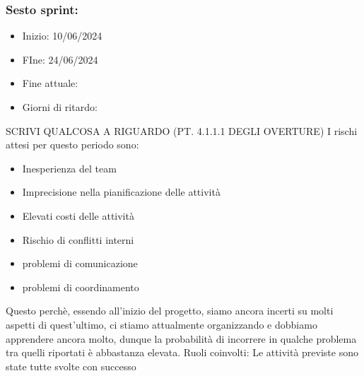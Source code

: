 \documentclass[italian,12pt]{article} %
\begin{document}
    \subsubsection{Sesto sprint:}
    \begin{itemize}
        \item Inizio: 10/06/2024
        \item FIne: 24/06/2024
        \item Fine attuale:
        \item Giorni di ritardo:
    \end{itemize}
    SCRIVI QUALCOSA A RIGUARDO (PT. 4.1.1.1 DEGLI OVERTURE)
    I rischi attesi per questo periodo sono:
    \begin{itemize}
        \item Inesperienza del team
        \item Imprecisione nella pianificazione delle attività
        \item Elevati costi delle attività
        \item Rischio di conflitti interni 
        \item problemi di comunicazione
        \item problemi di coordinamento
    \end{itemize}
    Questo perchè, essendo all’inizio del progetto, siamo ancora incerti su molti aspetti di quest’ultimo, ci stiamo attualmente organizzando e dobbiamo apprendere ancora molto, dunque la probabilità di incorrere in qualche problema tra quelli riportati è abbastanza elevata.
    Ruoli coinvolti: 
    Le attività previste sono state tutte svolte con successo
\end{document}

